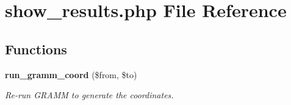 \section{show\_\-results.php File Reference}
\label{show__results_8php}
\subsection*{Functions}
\begin{CompactItemize}
\item 
{\bf run\_\-gramm\_\-coord} (\$from, \$to)
\begin{CompactList}\small\item\em Re-run GRAMM to generate the coordinates. \item\end{CompactList}\end{CompactItemize}

